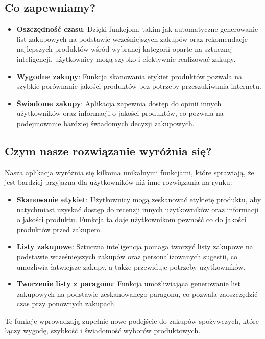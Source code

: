 \documentclass[12pt,a4paper]{article}
\begin{document}
\subsection*{Co zapewniamy?}
\begin{itemize}
    \item \textbf{Oszczędność czasu}: Dzięki funkcjom, takim jak automatyczne generowanie list
        zakupowych na podstawie wcześniejszych zakupów oraz rekomendacje najlepszych produktów
        wśród wybranej kategorii oparte na sztucznej inteligencji, użytkownicy mogą szybko i
        efektywnie realizować zakupy.
    \item \textbf{Wygodne zakupy}: Funkcja skanowania etykiet produktów pozwala na szybkie
        porównanie jakości produktów bez potrzeby przeszukiwania internetu.
    \item \textbf{Świadome zakupy}: Aplikacja zapewnia dostęp do opinii innych użytkowników oraz informacji o jakości produktów, co pozwala na podejmowanie bardziej świadomych decyzji zakupowych.
\end{itemize}

\subsection*{Czym nasze rozwiązanie wyróżnia się?}

Nasza aplikacja wyróżnia się kilkoma unikalnymi funkcjami, które sprawiają, że jest bardziej przyjazna dla użytkowników niż inne rozwiązania na rynku:
\begin{itemize}
    \item \textbf{Skanowanie etykiet}: Użytkownicy mogą zeskanować etykietę produktu, aby
        natychmiast uzyskać dostęp do recenzji innych użytkowników oraz informacji o jakości
        produktu. Funkcja ta daje użytkownikom pewność co do jakości produktów przed zakupem.
    \item \textbf{Listy zakupowe}: Sztuczna inteligencja pomaga tworzyć listy zakupowe na podstawie wcześniejszych zakupów oraz personalizowanych sugestii, co umożliwia łatwiejsze zakupy, a także przewiduje potrzeby użytkowników.
    \item \textbf{Tworzenie listy z paragonu}: Funkcja umożliwiająca generowanie list zakupowych na podstawie zeskanowanego paragonu, co pozwala zaoszczędzić czas przy ponownych zakupach.
\end{itemize}

Te funkcje wprowadzają zupełnie nowe podejście do zakupów spożywczych, które łączy wygodę, szybkość i świadomość wyborów produktowych.
\end{document}
